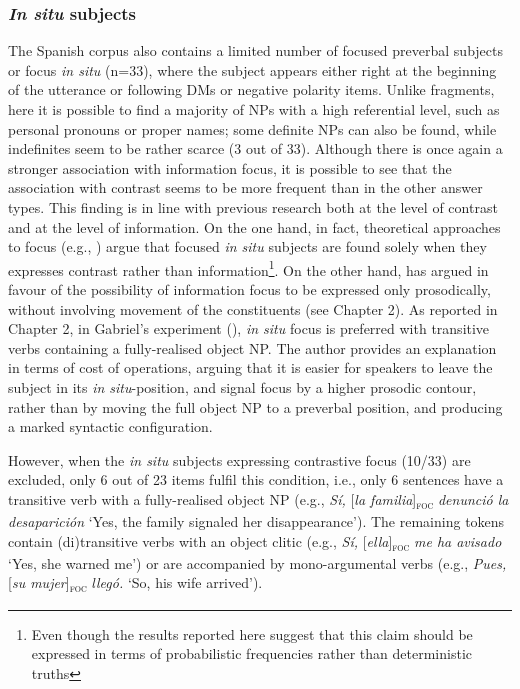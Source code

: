 \subsubsection{\textit{In situ} subjects}

The Spanish corpus also contains a limited number of focused preverbal subjects or focus \textit{in situ} (n=33), where the subject appears either right at the beginning of the utterance or following DMs or negative polarity items. Unlike fragments, here it is possible to find a majority of NPs with a high referential level, such as personal pronouns or proper names; some definite NPs can also be found, while indefinites seem to be rather scarce (3 out of 33). 
Although there is once again a stronger association with information focus, it is possible to see that the association with contrast seems to be more frequent than in the other answer types. 
This finding is in line with previous research both at the level of contrast and at the level of information. On the one hand, in fact, theoretical approaches to focus (e.g., \cite{zubizarreta1998prosody}) argue that  focused \textit{in situ} subjects are found solely when they expresses contrast rather than information\footnote{Even though the results reported here suggest that this claim should be expressed in terms of probabilistic frequencies rather than deterministic truths}. On the other hand, \textcite{gabriel2007fokus} has argued in favour of the possibility of information focus to be expressed only prosodically, without involving movement of the constituents (see Chapter 2). As reported in Chapter 2, in Gabriel's experiment (\citeyear{gabriel2007fokus}), \textit{in situ} focus is preferred with transitive verbs containing a fully-realised object NP. The author provides an explanation in terms of cost of operations, arguing that it is easier for speakers to leave the subject in its \textit{in situ}-position, and signal focus by a higher prosodic contour, rather than by moving the full object NP to a preverbal position, and producing a marked syntactic configuration. 

However, when the \textit{in situ} subjects expressing contrastive focus (10/33) are excluded, only 6 out of 23 items fulfil this condition, i.e., only 6 sentences have a transitive verb with a fully-realised object NP (e.g., \textit{Sí,} [\textit{\textit{la familia}}]\textsubscript{\textsc{foc}} \normalsize \textit{denunció la desaparición} `Yes, the family signaled her disappearance'). The remaining tokens contain (di)transitive verbs with an object clitic (e.g., \textit{Sí,} [\textit{\textit{ella}}]\textsubscript{\textsc{foc}} \normalsize \textit{me ha avisado} `Yes, she warned me') or are accompanied by mono-argumental verbs (e.g., \textit{Pues,} [\textit{\textit{su mujer}}]\textsubscript{\textsc{foc}} \normalsize \textit{llegó.} `So, his wife arrived').

